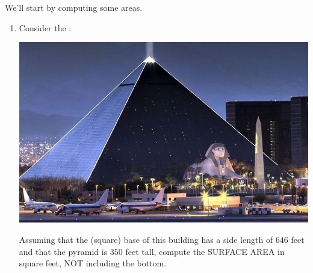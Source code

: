 \documentclass[hints,nooutcomes,noauthor]{ximera}
\begin{document}
\begin{question} We'll start by computing some areas.
\begin{enumerate}
\item Consider the :
  \begin{center}
    \includegraphics[width=.4\textwidth]{pyramid.jpg} 
  \end{center}
 Assuming that the (square) base of this building has a side length of
 $646$ feet and that the pyramid is $350$ feet tall, compute the
 SURFACE AREA in square feet, NOT including the bottom. 
 

\end{enumerate}
\end{question}
\end{document}
